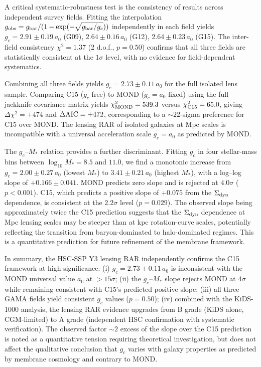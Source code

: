 \documentclass[11pt,a4paper]{article}
\newcommand{\gobs}{g_{\rm obs}}
\newcommand{\gbar}{g_{\rm bar}}
\newcommand{\gc}{g_{c}}
\newcommand{\ao}{a_{0}}
\newcommand{\sigdyn}{\Sigma_{\rm dyn}}
\newcommand{\AIC}{\Delta{\rm AIC}}
\newcommand{\chisq}{\chi^{2}}
\begin{document}
A critical systematic-robustness test is the consistency of results across independent survey fields.
Fitting the interpolation $\gobs = \gbar/(1 - \exp(-\sqrt{\gbar/\gc}))$ independently in each field yields
$\gc = 2.91 \pm 0.19\,\ao$ (G09), $2.64 \pm 0.16\,\ao$ (G12), $2.64 \pm 0.23\,\ao$ (G15). The inter-field
consistency $\chisq = 1.37$ (2 d.o.f., $p = 0.50$) confirms that all three fields are statistically
consistent at the $1\sigma$ level, with no evidence for field-dependent systematics.

Combining all three fields yields $\gc = 2.73 \pm 0.11\,\ao$ for the full isolated lens sample. Comparing
C15 ($\gc$ free) to MOND ($\gc = \ao$ fixed) using the full jackknife covariance matrix yields
$\chisq_{\rm MOND} = 539.3$ versus $\chisq_{\rm C15} = 65.0$, giving $\Delta\chisq = +474$ and
$\AIC = +472$, corresponding to a $\sim 22$-sigma preference for C15 over MOND. The lensing RAR of isolated
galaxies at Mpc scales is incompatible with a universal acceleration scale $\gc = \ao$ as predicted by MOND.

The $\gc$--$M_\ast$ relation provides a further discriminant. Fitting $\gc$ in four stellar-mass bins
between $\log_{10} M_\ast = 8.5$ and $11.0$, we find a monotonic increase from $\gc = 2.00 \pm 0.27\,\ao$
(lowest $M_\ast$) to $3.41 \pm 0.21\,\ao$ (highest $M_\ast$), with a log--log slope of $+0.166 \pm 0.041$.
MOND predicts zero slope and is rejected at $4.0\sigma$ ($p < 0.001$). C15, which predicts a positive slope
of $+0.075$ from the $\sigdyn$ dependence, is consistent at the $2.2\sigma$ level ($p = 0.029$). The observed
slope being approximately twice the C15 prediction suggests that the $\sigdyn$ dependence at Mpc lensing
scales may be steeper than at kpc rotation-curve scales, potentially reflecting the transition from
baryon-dominated to halo-dominated regimes. This is a quantitative prediction for future refinement of the
membrane framework.

In summary, the HSC-SSP Y3 lensing RAR independently confirms the C15 framework at high significance:
(i) $\gc = 2.73 \pm 0.11\,\ao$ is inconsistent with the MOND universal value $\ao$ at $> 15\sigma$;
(ii) the $\gc$--$M_\ast$ slope rejects MOND at $4\sigma$ while remaining consistent with C15's predicted
positive slope;
(iii) all three GAMA fields yield consistent $\gc$ values ($p = 0.50$);
(iv) combined with the KiDS-1000 analysis, the lensing RAR evidence upgrades from B grade (KiDS alone,
CGM-limited) to A grade (independent HSC confirmation with systematic verification). The observed factor
$\sim 2$ excess of the slope over the C15 prediction is noted as a quantitative tension requiring
theoretical investigation, but does not affect the qualitative conclusion that $\gc$ varies with galaxy
properties as predicted by membrane cosmology and contrary to MOND.
\end{document}
